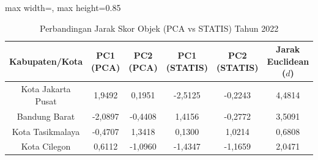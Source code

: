 \begin{table}[H]
\centering
\caption{Perbandingan Jarak Skor Objek (PCA vs STATIS) Tahun 2022} \label{tab:sample1jarak_skor_2022}
\begin{adjustbox}{max width=\textwidth, max height=0.85\textheight}
\begin{tabular}{|c|c|c|c|c|c|}
\hline
\textbf{Kabupaten/Kota} & \textbf{PC1 (PCA)} & \textbf{PC2 (PCA)} & \textbf{PC1 (STATIS)} & \textbf{PC2 (STATIS)} & \textbf{Jarak Euclidean ($d$)} \\
\hline
Kota Jakarta Pusat & 1,9492 & 0,1951 & -2,5125 & -0,2243 & 4,4814 \\
Bandung Barat & -2,0897 & -0,4408 & 1,4156 & -0,2772 & 3,5091 \\
Kota Tasikmalaya & -0,4707 & 1,3418 & 0,1300 & 1,0214 & 0,6808 \\
Kota Cilegon & 0,6112 & -1,0960 & -1,4347 & -1,1659 & 2,0471 \\
\hline
\end{tabular}
\end{adjustbox}
\end{table}